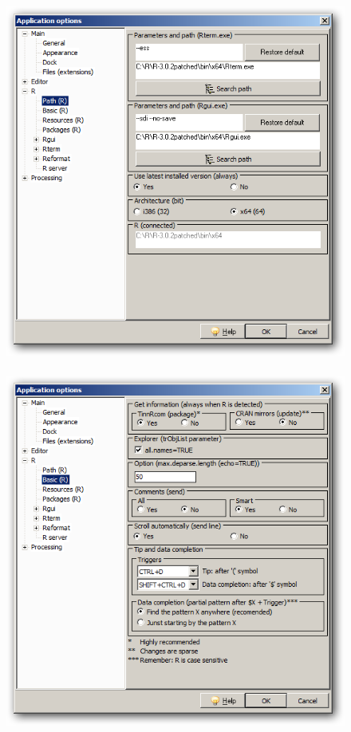 \begin{figure}[h!]
  \includegraphics[scale=0.35]{./res/app_r_path.png}~~
  \includegraphics[scale=0.35]{./res/app_r_basic.png}\\

\end{figure}
